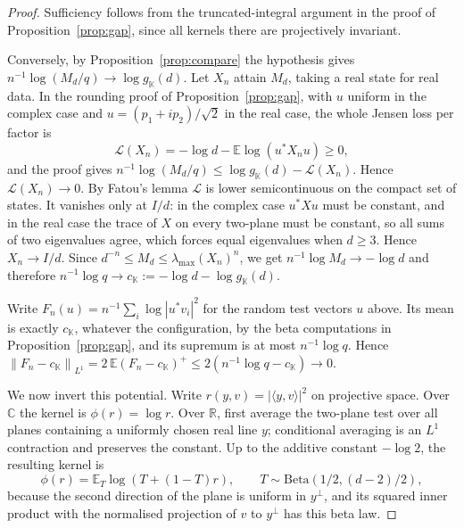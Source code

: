 \documentclass[11pt,a4paper]{article}
\theoremstyle{remark}
\newcommand{\norm}[1]{\left\lVert#1\right\rVert}
\newcommand{\C}{\mathbb C}
\newcommand{\R}{\mathbb R}
\newcommand{\K}{\mathbb K}
\begin{document}
\begin{proof}
Sufficiency follows from the truncated-integral argument in the proof of Proposition~\ref{prop:gap}, since all kernels there are projectively invariant.

Conversely, by Proposition~\ref{prop:compare} the hypothesis gives $n^{-1}\log(M_d/q)\to\log g_\K(d)$. Let $X_n$ attain $M_d$, taking a real state for real data. In the rounding proof of Proposition~\ref{prop:gap}, with $u$ uniform in the complex case and $u=(p_1+ip_2)/\sqrt2$ in the real case, the whole Jensen loss per factor is
\[
 \mathcal L(X_n)=-\log d-\mathbb E\log(u^*X_nu)\ge0,
\]
and the proof gives $n^{-1}\log(M_d/q)\le\log g_\K(d)-\mathcal L(X_n)$. Hence $\mathcal L(X_n)\to0$. By Fatou's lemma $\mathcal L$ is lower semicontinuous on the compact set of states. It vanishes only at $I/d$: in the complex case $u^*Xu$ must be constant, and in the real case the trace of $X$ on every two-plane must be constant, so all sums of two eigenvalues agree, which forces equal eigenvalues when $d\ge3$. Hence $X_n\to I/d$. Since $d^{-n}\le M_d\le\lambda_{\max}(X_n)^n$, we get $n^{-1}\log M_d\to-\log d$ and therefore $n^{-1}\log q\to c_\K:=-\log d-\log g_\K(d)$.

Write $F_n(u)=n^{-1}\sum_i\log|u^*v_i|^2$ for the random test vectors $u$ above. Its mean is exactly $c_\K$, whatever the configuration, by the beta computations in Proposition~\ref{prop:gap}, and its supremum is at most $n^{-1}\log q$. Hence $\norm{F_n-c_\K}_{L^1}=2\,\mathbb E(F_n-c_\K)^+\le2(n^{-1}\log q-c_\K)\to0$.

We now invert this potential. Write $r(y,v)=|\langle y,v\rangle|^2$ on projective space. Over $\C$ the kernel is $\phi(r)=\log r$. Over $\R$, first average the two-plane test over all planes containing a uniformly chosen real line $y$; conditional averaging is an $L^1$ contraction and preserves the constant. Up to the additive constant $-\log2$, the resulting kernel is
\[
 \phi(r)=\mathbb E_T\log(T+(1-T)r),\qquad T\sim\mathrm{Beta}(1/2,(d-2)/2),
\]
because the second direction of the plane is uniform in $y^\perp$, and its squared inner product with the normalised projection of $v$ to $y^\perp$ has this beta law.


\end{proof}
\end{document}
